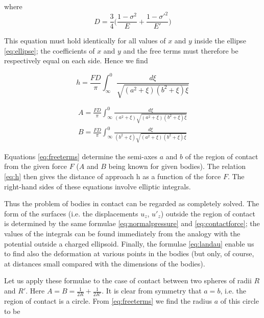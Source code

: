 where
\begin{equation*}
D = \frac{3}{4} \Big( \frac{1-\sigma^{2}}{E} + \frac{1-\sigma'^{2}}{E'} \Big)
\end{equation*}

This equation must hold identically for all values of $x$ and $y$ inside the ellipse \ref{eq:ellipse}; the coefficients of $x$ and $y$ and the free terms must therefore be respectively equal on each side. Hence we find

\begin{equation}
h = \frac{FD}{\pi} \int_{\infty}^{0} \frac{d\xi}{\sqrt{(a^{2} + \xi)(b^{2} + \xi)\xi}}
\label{eq:h}
\end{equation}

\begin{equation}
\begin{split}
A = \frac{FD}{\pi} \int_{\infty}^{0} \frac{d\xi}{(a^{2}+\xi)\sqrt{(a^{2} + \xi)(b^{2} + \xi)\xi}} \\
B = \frac{FD}{\pi} \int_{\infty}^{0} \frac{d\xi}{(b^{2}+\xi)\sqrt{(a^{2} + \xi)(b^{2} + \xi)\xi}}
\end{split}
\label{eq:freeterms}
\end{equation}

Equations \ref{eq:freeterms} determine the semi-axes $a$ and $b$ of the region of contact from the given force $F$ ($A$ and $B$ being known for given bodies). The relation \ref{eq:h} then gives the distance of approach h as a function of the force $F$. The right-hand sides of these equations involve elliptic integrals.



Thus the problem of bodies in contact can be regarded as completely
solved. The form of the surfaces (i.e. the displacements $u_{z}$, $u'_{z}$) outside the region of contact is determined by the same formulae \ref{eq:normalpressure} and \ref{eq:contactforce}; the values of the integrals can be found immediately from the analogy with the potential outside a charged ellipsoid. Finally, the formulae \ref{eq:landau} enable us to find also the deformation at various points in the bodies (but only, of course, at distances small compared with the dimensions of the bodies).

Let us apply these formulae to the case of contact between two spheres of
radii $R$ and $R'$. Here $A = B = \frac{1}{2R} + \frac{1}{2R'}$. It is clear from symmetry that $a = b$, i.e. the region of contact is a circle. From \ref{eq:freeterms} we find the radius $a$ of this circle to be

